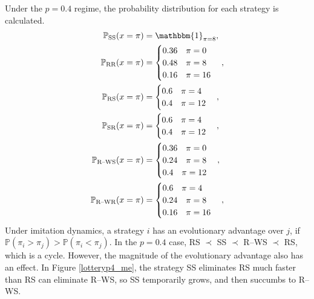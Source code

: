 Under the $p=0.4$ regime, the probability distribution for each strategy is calculated. 
 \begin{align*}
 \mathbb P_{\text{SS}}(x = \pi)  &= \mathbbm{1}_{\pi = 8}, \\
 \mathbb P_{\text{RR}}(x = \pi)  &= \begin{cases} 0.36 \quad \pi = 0 \\
    0.48 \quad \pi =8 \\ 0.16 \quad \pi = 16
    \end{cases}, \\
    \mathbb P_{\text{RS}}(x = \pi)  &= \begin{cases} 0.6 \quad \pi =4  \\
     0.4 \quad \pi = 12
    \end{cases}, \\
    \mathbb P_{\text{SR}}(x = \pi)  &= \begin{cases} 0.6 \quad \pi =4  \\
     0.4 \quad \pi = 12
    \end{cases}, \\
        \mathbb P_{\text{R--WS}}(x = \pi)  &= \begin{cases} 0.36 \quad \pi = 0 \\
    0.24 \quad \pi =8 \\
    0.4 \quad \pi = 12\\
    \end{cases}, \\
    \mathbb P_{\text{R--WR}}(x = \pi)  &= \begin{cases} 0.6 \quad \pi = 4 \\
    0.24 \quad \pi =8 \\
    0.16 \quad \pi = 16\\
    \end{cases}, \\
\end{align*}
Under imitation dynamics, a strategy $i$ has an evolutionary advantage over $j$, if $\mathbb P(\pi_i > \pi_j) > \mathbb P(\pi_i < \pi_j)$. In the $p=0.4$ case, RS $\prec$ SS $\prec$ R--WS $\prec$ RS, which is a cycle. However, the magnitude of the evolutionary advantage also has an effect. In Figure \ref{lotteryp4_me}, the strategy SS eliminates RS much faster than RS can eliminate R--WS, so SS temporarily grows, and then succumbs to R--WS. \\

